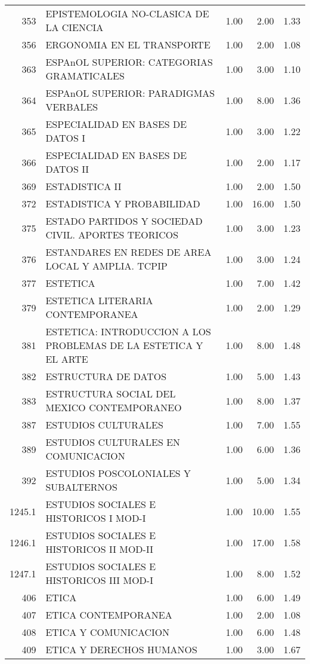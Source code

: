\begin{table}[ht]
\begin{tabular}{rlrrr}
  353 & EPISTEMOLOGIA NO-CLASICA DE LA CIENCIA & 1.00 & 2.00 & 1.33 \\ 
  356 & ERGONOMIA EN EL TRANSPORTE & 1.00 & 2.00 & 1.08 \\ 
  363 & ESPAnOL SUPERIOR: CATEGORIAS GRAMATICALES & 1.00 & 3.00 & 1.10 \\ 
  364 & ESPAnOL SUPERIOR: PARADIGMAS VERBALES & 1.00 & 8.00 & 1.36 \\ 
  365 & ESPECIALIDAD EN BASES DE DATOS I & 1.00 & 3.00 & 1.22 \\ 
  366 & ESPECIALIDAD EN BASES DE DATOS II & 1.00 & 2.00 & 1.17 \\ 
  369 & ESTADISTICA II & 1.00 & 2.00 & 1.50 \\ 
  372 & ESTADISTICA Y PROBABILIDAD & 1.00 & 16.00 & 1.50 \\ 
  375 & ESTADO PARTIDOS Y SOCIEDAD CIVIL. APORTES TEORICOS & 1.00 & 3.00 & 1.23 \\ 
  376 & ESTANDARES EN REDES DE AREA LOCAL Y AMPLIA. TCPIP & 1.00 & 3.00 & 1.24 \\ 
  377 & ESTETICA & 1.00 & 7.00 & 1.42 \\ 
  379 & ESTETICA LITERARIA CONTEMPORANEA & 1.00 & 2.00 & 1.29 \\ 
  381 & ESTETICA: INTRODUCCION A LOS PROBLEMAS DE LA ESTETICA Y EL ARTE & 1.00 & 8.00 & 1.48 \\ 
  382 & ESTRUCTURA DE DATOS & 1.00 & 5.00 & 1.43 \\ 
  383 & ESTRUCTURA SOCIAL DEL MEXICO CONTEMPORANEO & 1.00 & 8.00 & 1.37 \\ 
  387 & ESTUDIOS CULTURALES & 1.00 & 7.00 & 1.55 \\ 
  389 & ESTUDIOS CULTURALES EN COMUNICACION & 1.00 & 6.00 & 1.36 \\ 
  392 & ESTUDIOS POSCOLONIALES Y SUBALTERNOS & 1.00 & 5.00 & 1.34 \\ 
  1245.1 & ESTUDIOS SOCIALES E HISTORICOS I MOD-I & 1.00 & 10.00 & 1.55 \\ 
  1246.1 & ESTUDIOS SOCIALES E HISTORICOS II MOD-II & 1.00 & 17.00 & 1.58 \\ 
  1247.1 & ESTUDIOS SOCIALES E HISTORICOS III MOD-I & 1.00 & 8.00 & 1.52 \\ 
  406 & ETICA & 1.00 & 6.00 & 1.49 \\ 
  407 & ETICA CONTEMPORANEA & 1.00 & 2.00 & 1.08 \\ 
  408 & ETICA Y COMUNICACION & 1.00 & 6.00 & 1.48 \\ 
  409 & ETICA Y DERECHOS HUMANOS & 1.00 & 3.00 & 1.67 \\ 

\end{tabular}
\end{table}
